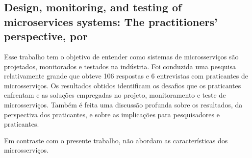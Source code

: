 
\subsection{Design, monitoring, and testing of microservices systems: The practitioners’ perspective, por \texorpdfstring{}{Waseem et al. (2021)}}

Esse trabalho tem o objetivo de entender como sistemas de microsserviços são projetados, monitorados e testados na indústria. Foi conduzida uma pesquisa relativamente grande que obteve 106 respostas e 6 entrevistas com praticantes de microsserviços. Os resultados obtidos identificam os desafios que os praticantes enfrentam e as soluções empregadas no projeto, monitoramento e teste de microsserviços. Também é feita uma discussão profunda sobre os resultados, da perspectiva dos praticantes, e sobre as implicações para pesquisadores e praticantes.

Em contraste com o presente trabalho,  não abordam as características dos microsserviços.



